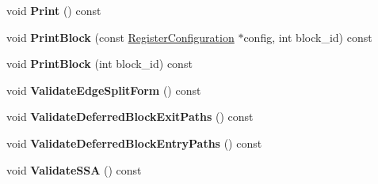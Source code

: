 \begin{DoxyCompactItemize}
\item 
void {\bfseries Print} () const \hypertarget{classv8_1_1internal_1_1compiler_1_1_instruction_sequence_ab91023e15dec658edb948b8d4e4197eb}{}\label{classv8_1_1internal_1_1compiler_1_1_instruction_sequence_ab91023e15dec658edb948b8d4e4197eb}

\item 
void {\bfseries Print\+Block} (const \hyperlink{classv8_1_1internal_1_1_register_configuration}{Register\+Configuration} $\ast$config, int block\+\_\+id) const \hypertarget{classv8_1_1internal_1_1compiler_1_1_instruction_sequence_abcf025413f277dd857f14e690cbfd368}{}\label{classv8_1_1internal_1_1compiler_1_1_instruction_sequence_abcf025413f277dd857f14e690cbfd368}

\item 
void {\bfseries Print\+Block} (int block\+\_\+id) const \hypertarget{classv8_1_1internal_1_1compiler_1_1_instruction_sequence_ad9a166f7116bdc1df878567271b39838}{}\label{classv8_1_1internal_1_1compiler_1_1_instruction_sequence_ad9a166f7116bdc1df878567271b39838}

\item 
void {\bfseries Validate\+Edge\+Split\+Form} () const \hypertarget{classv8_1_1internal_1_1compiler_1_1_instruction_sequence_a95520e470ff5beedd8f58fcce11a9802}{}\label{classv8_1_1internal_1_1compiler_1_1_instruction_sequence_a95520e470ff5beedd8f58fcce11a9802}

\item 
void {\bfseries Validate\+Deferred\+Block\+Exit\+Paths} () const \hypertarget{classv8_1_1internal_1_1compiler_1_1_instruction_sequence_a4ad72eadbe40d06036e325492ed3ecf3}{}\label{classv8_1_1internal_1_1compiler_1_1_instruction_sequence_a4ad72eadbe40d06036e325492ed3ecf3}

\item 
void {\bfseries Validate\+Deferred\+Block\+Entry\+Paths} () const \hypertarget{classv8_1_1internal_1_1compiler_1_1_instruction_sequence_a0adf4c85f4ac52b4b06377bee79fe80d}{}\label{classv8_1_1internal_1_1compiler_1_1_instruction_sequence_a0adf4c85f4ac52b4b06377bee79fe80d}

\item 
void {\bfseries Validate\+S\+SA} () const \hypertarget{classv8_1_1internal_1_1compiler_1_1_instruction_sequence_ae93d0b721f517e090a277f105a05ca38}{}\label{classv8_1_1internal_1_1compiler_1_1_instruction_sequence_ae93d0b721f517e090a277f105a05ca38}

\end{DoxyCompactItemize}

